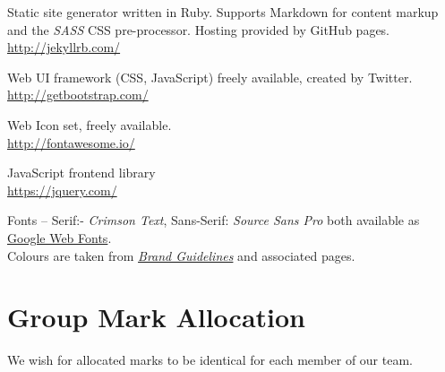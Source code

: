 \documentclass[a4paper, notoc]{tufte-handout}
\let\origdescription\description
\renewenvironment{description}{
  \setlength{\leftmargini}{1.5em}
  \origdescription
  \setlength{\itemindent}{-1.5em}
  \setlength{\labelsep}{\textwidth}
}
{\endlist}
\begin{document}
\begin{description}

\item[Jekyll]
Static site generator written in Ruby. Supports Markdown for 
content markup and the \textit{SASS} CSS pre-processor.
Hosting provided by GitHub pages.
\\
\href{http://jekyllrb.com/}{http://jekyllrb.com/}

\item[BootStrap]
Web UI framework (CSS, JavaScript) freely available, created by Twitter.
\\
\href{http://getbootstrap.com/}{http://getbootstrap.com/}

\item[FontAwesome]
Web Icon set, freely available.
\\
\href{http://fontawesome.io/}{http://fontawesome.io/}


\item[JQuery]
JavaScript frontend library
\\
\href{https://jquery.com/}{https://jquery.com/}

\item[University of Edinburgh Style Guide]
Fonts -- Serif:- \textit{Crimson Text}, Sans-Serif: \textit{Source Sans Pro} both 
available as \href{https://fonts.google.com/}{Google Web Fonts}.
\\
Colours are taken from 
\href{http://www.ed.ac.uk/communications-marketing/resources}{\textit{Brand Guidelines}} 
and associated pages.
\\



\end{description}




\section*{Group Mark Allocation}\label{group-mark-allocation}


We wish for allocated marks to be identical for each member of our team.
\end{document}
